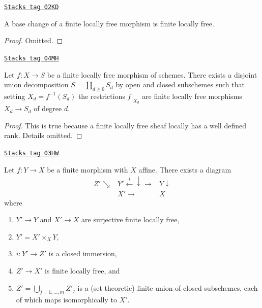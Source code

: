 \begin{lemma}
\label{morphisms-lemma-base-change-finite-locally-free}
\href{https://stacks.math.columbia.edu/tag/02KD}{\texttt{Stacks tag 02KD}}

A base change of a finite locally free morphism is finite locally free.
\end{lemma}

\begin{proof}
Omitted.
\end{proof}

\begin{lemma}
\label{morphisms-lemma-finite-locally-free}
\href{https://stacks.math.columbia.edu/tag/04MH}{\texttt{Stacks tag 04MH}}

Let $f : X \to S$ be a finite locally free morphism of schemes.
There exists a disjoint union decomposition
$S = \coprod_{d \geq 0} S_d$ by open and closed subschemes
such that setting $X_d = f^{-1}(S_d)$ the restrictions
$f|_{X_d}$ are finite locally free morphisms $X_d \to S_d$
of degree $d$.
\end{lemma}

\begin{proof}
This is true because a finite locally free sheaf locally has
a well defined rank. Details omitted.
\end{proof}

\begin{lemma}
\label{morphisms-lemma-massage-finite}
\href{https://stacks.math.columbia.edu/tag/03HW}{\texttt{Stacks tag 03HW}}

Let $f : Y \to X$ be a finite morphism with $X$ affine.
There exists a diagram
$$
\begin{array}{ccc}Z' \searrow & Y' \overset{i}{\longleftarrow}\downarrow\longrightarrow & Y \downarrow \\  & X' \longrightarrow & X\end{array}
$$
where
\begin{enumerate}
\item $Y' \to Y$ and $X' \to X$ are surjective finite locally free,
\item $Y' = X' \times_X Y$,
\item $i : Y' \to Z'$ is a closed immersion,
\item $Z' \to X'$ is finite locally free, and
\item $Z' = \bigcup_{j = 1, \ldots, m} Z'_j$ is a (set theoretic)
finite union of closed subschemes, each of which maps isomorphically
to $X'$.
\end{enumerate}
\end{lemma}

